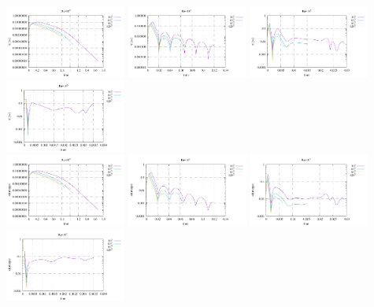 \begin{center}
\includegraphics[width=3.97cm]{python_codes/fieldstone_155/results/conv_psi_Ra1e3}
\includegraphics[width=3.97cm]{python_codes/fieldstone_155/results/conv_psi_Ra1e4}
\includegraphics[width=3.97cm]{python_codes/fieldstone_155/results/conv_psi_Ra1e5}
\includegraphics[width=3.97cm]{python_codes/fieldstone_155/results/conv_psi_Ra1e6}\\
\includegraphics[width=3.97cm]{python_codes/fieldstone_155/results/conv_omega_Ra1e3}
\includegraphics[width=3.97cm]{python_codes/fieldstone_155/results/conv_omega_Ra1e4}
\includegraphics[width=3.97cm]{python_codes/fieldstone_155/results/conv_omega_Ra1e5}
\includegraphics[width=3.97cm]{python_codes/fieldstone_155/results/conv_omega_Ra1e6}\\
\end{center}

